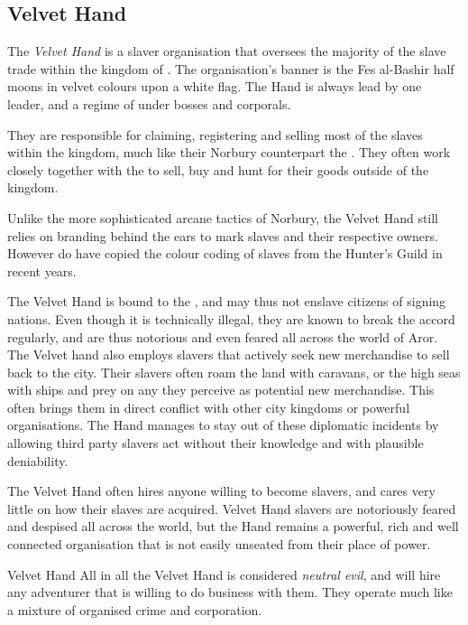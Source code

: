 \subsection{Velvet Hand}
\label{sec:Velvet Hand}

The \emph{Velvet Hand} is a slaver organisation that oversees the majority of
the slave trade within the kingdom of . The
organisation's banner is the Fes al-Bashir half moons in velvet colours upon a
white flag. The Hand is always lead by one leader, and a regime of under
bosses and corporals.

They are responsible for claiming, registering and selling most of the slaves
within the kingdom, much like their Norbury counterpart the
. They often work closely together with the
 to sell, buy and hunt for their
goods outside of the kingdom.

Unlike the more sophisticated arcane tactics of Norbury, the Velvet Hand still
relies on branding behind the ears to mark slaves and their respective
owners. However do have copied the colour coding of slaves from the Hunter's
Guild in recent years.

The Velvet Hand is bound to the , and may thus not
enslave citizens of signing nations. Even though it is technically illegal,
they are known to break the accord regularly, and are thus notorious and even
feared all across the world of Aror. The Velvet hand also employs slavers that
actively seek new merchandise to sell back to the city. Their slavers often
roam the land with caravans, or the high seas with ships and prey on any they
perceive as potential new merchandise. This often brings them in direct
conflict with other city kingdoms or powerful organisations. The Hand manages
to stay out of these diplomatic incidents by allowing third party slavers act
without their knowledge and with plausible deniability.

The Velvet Hand often hires anyone willing to become slavers, and cares very
little on how their slaves are acquired. Velvet Hand slavers are notoriously
feared and despised all across the world, but the Hand remains a powerful,
rich and well connected organisation that is not easily unseated from their
place of power.

\begin{35e}{Velvet Hand}
  All in all the Velvet Hand is considered \emph{neutral evil}, and will hire
  any adventurer that is willing to do business with them. They operate much
  like a mixture of organised crime and corporation.
\end{35e}
